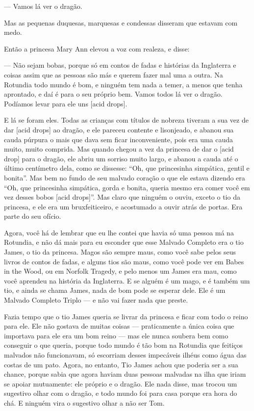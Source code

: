 — Vamos lá ver o dragão.

Mas as pequenas duquesas, marquesas e condessas disseram que estavam
com medo.

Então a princesa Mary Ann elevou a voz com realeza, e disse:

— Não sejam bobas, porque só em contos de fadas e histórias da
Inglaterra e coisas assim que as pessoas são más e querem fazer mal
uma a outra. Na Rotundia todo mundo é bom, e ninguém tem nada a
temer, a menos que tenha aprontado, e daí é para o seu próprio bem.
Vamos todos lá ver o dragão. Podíamos levar para ele uns [acid
drops].

E lá se foram eles. Todas as crianças com títulos de nobreza tiveram a
sua vez de dar [acid drops] ao dragão, e ele pareceu contente e
lisonjeado, e abanou sua cauda púrpura o mais que dava sem ficar
inconveniente, pois era uma cauda muito, muito comprida. Mas quando
chegou a vez da princesa de dar o [acid drop] para o dragão, ele
abriu um sorriso muito largo, e abanou a cauda até o último
centímetro dela, como se dissesse: “Oh, que princesinha simpática,
gentil e bonita”. Mas bem no fundo de seu malvado coração o que ele
estava dizendo era “Oh, que princesinha simpática, gorda e bonita,
queria mesmo era comer você em vez desses bobos [acid drops]”. Mas
claro que ninguém o ouviu, exceto o tio da princesa, e ele era um
bruxfeiticeiro, e acostumado a ouvir atrás de portas. Era parte do
seu ofício.

Agora, você há de lembrar que eu lhe contei que havia só uma pessoa má
na Rotundia, e não dá mais para eu esconder que esse Malvado Completo
era o tio James, o tio da princesa. Magos são sempre maus, como você
sabe pelos seus livros de contos de fadas, e alguns tios são maus,
como você pode ver em Babes in the Wood, ou em Norfolk Tragedy, e
pelo menos um James era mau, como você aprendeu na história da
Inglaterra. E se alguém é um mago, e é também um tio, e ainda se
chama James, nada de bom pode se esperar dele. Ele é um Malvado
Completo Triplo — e não vai fazer nada que preste. 

Fazia tempo que o tio James queria se livrar da princesa e ficar com
todo o reino para ele. Ele não gostava de muitas coisas —
praticamente a única coisa que importava para ele era um bom reino —
mas ele nunca soubera bem como conseguir o que queria, porque todo
mundo é tão bom na Rotundia que feitiços malvados não funcionavam, só
escorriam desses impecáveis ilhéus como água das costas de um pato.
Agora, no entanto, Tio James achou que poderia ser a sua chance,
porque sabia que agora haviam duas pessoas malvadas na ilha que iriam
se apoiar mutuamente: ele próprio e o dragão. Ele nada disse, mas
trocou um sugestivo olhar com o dragão, e todo mundo foi para casa
porque era hora do chá. E ninguém vira o sugestivo olhar a não ser
Tom.

